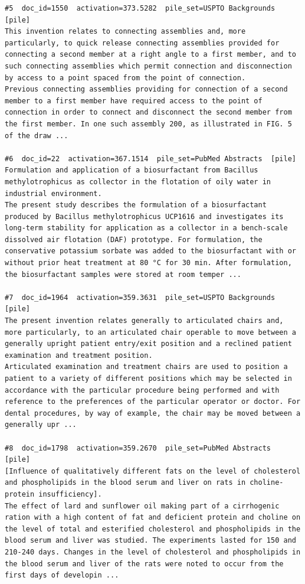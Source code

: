 \begin{verbatim}
#5  doc_id=1550  activation=373.5282  pile_set=USPTO Backgrounds  [pile]
This invention relates to connecting assemblies and, more particularly, to quick release connecting assemblies provided for connecting a second member at a right angle to a first member, and to such connecting assemblies which permit connection and disconnection by access to a point spaced from the point of connection.
Previous connecting assemblies providing for connection of a second member to a first member have required access to the point of connection in order to connect and disconnect the second member from the first member. In one such assembly 200, as illustrated in FIG. 5 of the draw ...

#6  doc_id=22  activation=367.1514  pile_set=PubMed Abstracts  [pile]
Formulation and application of a biosurfactant from Bacillus methylotrophicus as collector in the flotation of oily water in industrial environment.
The present study describes the formulation of a biosurfactant produced by Bacillus methylotrophicus UCP1616 and investigates its long-term stability for application as a collector in a bench-scale dissolved air flotation (DAF) prototype. For formulation, the conservative potassium sorbate was added to the biosurfactant with or without prior heat treatment at 80 °C for 30 min. After formulation, the biosurfactant samples were stored at room temper ...

#7  doc_id=1964  activation=359.3631  pile_set=USPTO Backgrounds  [pile]
The present invention relates generally to articulated chairs and, more particularly, to an articulated chair operable to move between a generally upright patient entry/exit position and a reclined patient examination and treatment position.
Articulated examination and treatment chairs are used to position a patient to a variety of different positions which may be selected in accordance with the particular procedure being performed and with reference to the preferences of the particular operator or doctor. For dental procedures, by way of example, the chair may be moved between a generally upr ...

#8  doc_id=1798  activation=359.2670  pile_set=PubMed Abstracts  [pile]
[Influence of qualitatively different fats on the level of cholesterol and phospholipids in the blood serum and liver on rats in choline-protein insufficiency].
The effect of lard and sunflower oil making part of a cirrhogenic ration with a high content of fat and deficient protein and choline on the level of total and esterified cholesterol and phospholipids in the blood serum and liver was studied. The experiments lasted for 150 and 210-240 days. Changes in the level of cholesterol and phospholipids in the blood serum and liver of the rats were noted to occur from the first days of developin ...


\end{verbatim}

